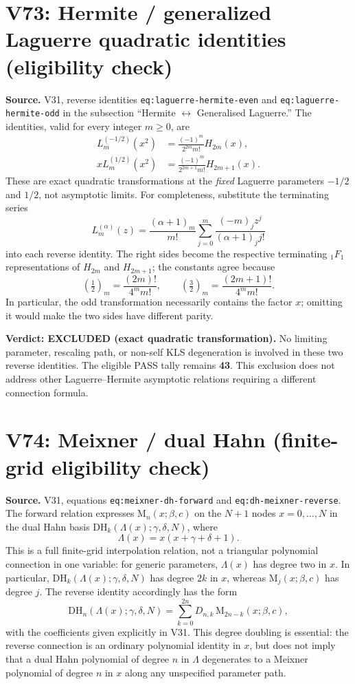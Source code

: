 \documentclass[11pt]{article}
\begin{document}
\section{V73: Hermite / generalized Laguerre quadratic identities (eligibility check)}
\noindent\textbf{Source.} V31, reverse identities
\texttt{eq:laguerre-hermite-even} and
\texttt{eq:laguerre-hermite-odd} in the subsection
``Hermite $\leftrightarrow$ Generalised Laguerre.''
The identities, valid for every integer $m\ge0$, are
\begin{align}
 L_m^{(-1/2)}(x^2)&=\frac{(-1)^m}{2^{2m}m!}H_{2m}(x),\\
 xL_m^{(1/2)}(x^2)&=\frac{(-1)^m}{2^{2m+1}m!}H_{2m+1}(x).
\end{align}
These are exact quadratic transformations at the \emph{fixed} Laguerre
parameters $-1/2$ and $1/2$, not asymptotic limits. For completeness,
substitute the terminating series
\[
 L_m^{(\alpha)}(z)=\frac{(\alpha+1)_m}{m!}
 \sum_{j=0}^{m}\frac{(-m)_j z^j}{(\alpha+1)_j j!}
\]
into each reverse identity. The right sides become the respective
terminating ${}_1F_1$ representations of $H_{2m}$ and $H_{2m+1}$;
the constants agree because
\[
 (\tfrac12)_m=\frac{(2m)!}{4^m m!},\qquad
 (\tfrac32)_m=\frac{(2m+1)!}{4^m m!}.
\]
In particular, the odd transformation necessarily contains the
factor $x$; omitting it would make the two sides have different parity.
\par\noindent\textbf{Verdict: EXCLUDED (exact quadratic transformation).}
No limiting parameter, rescaling path, or non-self KLS degeneration is
involved in these two reverse identities. The eligible PASS tally remains
\textbf{43}. This exclusion does not address other Laguerre--Hermite
asymptotic relations requiring a different connection formula.


\section{V74: Meixner / dual Hahn (finite-grid eligibility check)}
\noindent\textbf{Source.} V31, equations
\texttt{eq:meixner-dh-forward} and \texttt{eq:dh-meixner-reverse}.
The forward relation expresses $\mathrm M_n(x;\beta,c)$ on the
$N+1$ nodes $x=0,\ldots,N$ in the dual Hahn basis
$\mathrm{DH}_k(\Lambda(x);\gamma,\delta,N)$, where
\[
 \Lambda(x)=x(x+\gamma+\delta+1).
\]
This is a full finite-grid interpolation relation, not a triangular
polynomial connection in one variable: for generic parameters,
$\Lambda(x)$ has degree two in $x$.  In particular,
$\mathrm{DH}_k(\Lambda(x);\gamma,\delta,N)$ has degree $2k$ in $x$,
whereas $\mathrm M_j(x;\beta,c)$ has degree $j$.
The reverse identity accordingly has the form
\[
 \mathrm{DH}_n(\Lambda(x);\gamma,\delta,N)
   =\sum_{k=0}^{2n}D_{n,k}\,\mathrm M_{2n-k}(x;\beta,c),
\]
with the coefficients given explicitly in V31.  This degree doubling
is essential: the reverse connection is an ordinary polynomial
identity in $x$, but does not imply that a dual Hahn polynomial of
degree $n$ in $\Lambda$ degenerates to a Meixner polynomial of degree
$n$ in $x$ along any unspecified parameter path.
\end{document}
